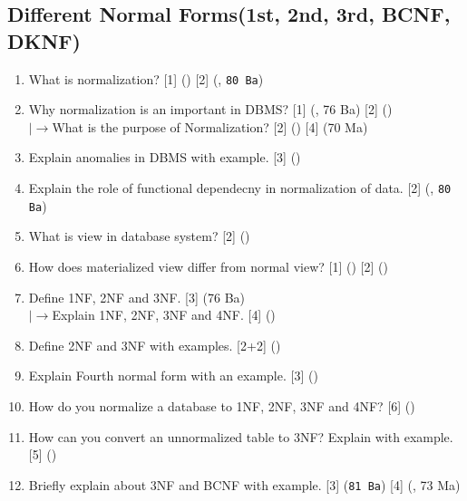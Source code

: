 \documentclass[12pt]{article}
\newcommand{\lb}{\\$\left|\rightarrow\right.$}
\begin{document}
    \subsection{Different Normal Forms(1st, 2nd, 3rd, BCNF, DKNF)}
    \begin{enumerate}[noitemsep, topsep = 0pt]
        \item What is normalization? \hfill [1] () [2] (, \texttt{80 Ba})
        
        \item Why normalization is an important in DBMS? \hfill [1] (, 76 Ba) [2] ()
        \lb What is the purpose of Normalization? \hfill [2] () [4] (70 Ma)
        
        \item Explain anomalies in DBMS with example. \hfill [3] ()
        
        \item Explain the role of functional dependecny in normalization of data. \hfill [2] (, \texttt{80 Ba})
        
        \item What is view in database system? \hfill [2] ()
        
        \item How does materialized view differ from normal view? \hfill [1] () [2] ()
        
        \item Define 1NF, 2NF and 3NF. \hfill [3] (76 Ba)
        \lb  Explain 1NF, 2NF, 3NF and 4NF. \hfill [4] ()
        
        \item Define 2NF and 3NF with examples. \hfill [2+2] ()
        
        \item Explain Fourth normal form with an example. \hfill [3] ()
        
        \item How do you normalize a database to 1NF, 2NF, 3NF and 4NF? \hfill [6] ()
        
        \item How can you convert an unnormalized table to 3NF? Explain with example. \hfill [5] ()
        
        \item Briefly explain about 3NF and BCNF with example. \hfill [3] (\texttt{81 Ba}) [4] (, 73 Ma)
        

\end{enumerate}
\end{document}
